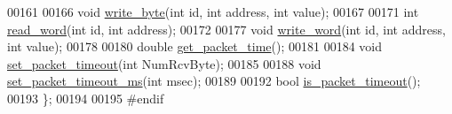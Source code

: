\begin{DoxyCode}
00161     
00166     \textcolor{keywordtype}{void} \hyperlink{a00004_a66c1e32cc45dd46d329f1fc212e46a3d}{write\_byte}(\textcolor{keywordtype}{int} \textcolor{keywordtype}{id}, \textcolor{keywordtype}{int} address, \textcolor{keywordtype}{int} value);
00167     
00171     \textcolor{keywordtype}{int}  \hyperlink{a00004_a45e99341e82c5114f6e829c9141bf96f}{read\_word}(\textcolor{keywordtype}{int} \textcolor{keywordtype}{id}, \textcolor{keywordtype}{int} address);
00172     
00177     \textcolor{keywordtype}{void} \hyperlink{a00004_a925f62ce5e261e5ef4fe6dc46bdc7c63}{write\_word}(\textcolor{keywordtype}{int} \textcolor{keywordtype}{id}, \textcolor{keywordtype}{int} address, \textcolor{keywordtype}{int} value);    
00178     
00180     \textcolor{keywordtype}{double} \hyperlink{a00004_a2fa5375537184c279a9ebfcfc0425071}{get\_packet\_time}();
00181     
00184     \textcolor{keywordtype}{void} \hyperlink{a00004_a067f82c21ed176e18fa224d16f3d1c5b}{set\_packet\_timeout}(\textcolor{keywordtype}{int} NumRcvByte);
00185     
00188     \textcolor{keywordtype}{void} \hyperlink{a00004_a125b42f776c4aac520f274074f68b591}{set\_packet\_timeout\_ms}(\textcolor{keywordtype}{int} msec);
00189     
00192     \textcolor{keywordtype}{bool} \hyperlink{a00004_a00d08481ebc4dee19debecf43f888522}{is\_packet\_timeout}();
00193 \};
00194 
00195 \textcolor{preprocessor}{#endif}
\end{DoxyCode}
